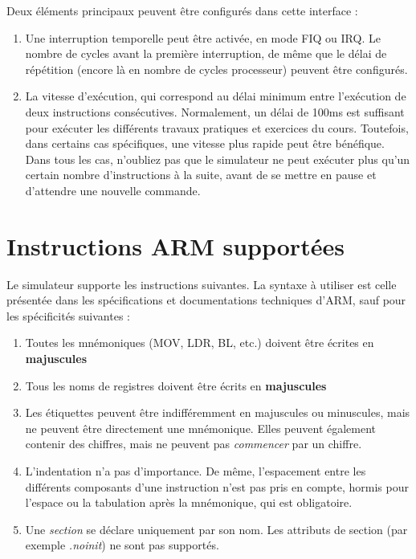 \documentclass{tufte-handout}
\begin{document}
Deux éléments principaux peuvent être configurés dans cette interface :
\begin{enumerate}
	\item Une interruption temporelle peut être activée, en mode FIQ ou IRQ. Le nombre de cycles avant la première interruption, de même que le délai de répétition (encore là en nombre de cycles processeur) peuvent être configurés.
	\item La vitesse d'exécution, qui correspond au délai minimum entre l'exécution de deux instructions consécutives. Normalement, un délai de 100ms est suffisant pour exécuter les différents travaux pratiques et exercices du cours. Toutefois, dans certains cas spécifiques, une vitesse plus rapide peut être bénéfique. Dans tous les cas, n'oubliez pas que le simulateur ne peut exécuter plus qu'un certain nombre d'instructions à la suite, avant de se mettre en pause et d'attendre une nouvelle commande.
\end{enumerate}

\clearpage
\section{Instructions ARM supportées}

Le simulateur supporte les instructions suivantes. La syntaxe à utiliser est celle présentée dans les spécifications et documentations techniques d'ARM, sauf pour les spécificités suivantes :
\begin{enumerate}
	\item Toutes les mnémoniques (MOV, LDR, BL, etc.) doivent être écrites en \textbf{majuscules}
	\item Tous les noms de registres doivent être écrits en \textbf{majuscules}
	\item Les étiquettes peuvent être indifféremment en majuscules ou minuscules, mais ne peuvent être directement une mnémonique. Elles peuvent également contenir des chiffres, mais ne peuvent pas \textit{commencer} par un chiffre.
	\item L'indentation n'a pas d'importance. De même, l'espacement entre les différents composants d'une instruction n'est pas pris en compte, hormis pour l'espace ou la tabulation après la mnémonique, qui est obligatoire.
	\item Une \emph{section} se déclare uniquement par son nom. Les attributs de section (par exemple \textit{.noinit}) ne sont pas supportés.

\end{enumerate}
\end{document}
